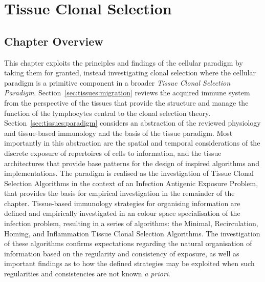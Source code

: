 %
%
\chapter{Tissue Clonal Selection}
\label{chap:tissues}

%
%
\section{Chapter Overview}
\label{sec:tissues:overview}
This chapter exploits the principles and findings of the cellular paradigm by taking them for granted, instead investigating clonal selection where the cellular paradigm is a primitive component in a broader \emph{Tissue Clonal Selection Paradigm}. 
Section~\ref{sec:tissues:migration} reviews the acquired immune system from the perspective of the tissues that provide the structure and manage the function of the lymphocytes central to the clonal selection theory. 
Section~\ref{sec:tissues:paradigm} considers an abstraction of the reviewed physiology and tissue-based immunology and the basis of the tissue paradigm. Most importantly in this abstraction are the spatial and temporal considerations of the discrete exposure of repertoires of cells to information, and the tissue architectures that provide base patterns for the design of inspired algorithms and implementations.
The paradigm is realised as the investigation of Tissue Clonal Selection Algorithms in the context of an Infection Antigenic Exposure Problem, that provides the basis for empirical investigation in the remainder of the chapter. Tissue-based immunology strategies for organising information are defined and empirically investigated in an colour space specialisation of the infection problem, resulting in a series of algorithms: the Minimal, Recirculation, Homing, and Inflammation Tissue Clonal Selection Algorithms. 
The investigation of these algorithms confirms expectations regarding the natural organisation of information based on the regularity and consistency of exposure, as well as important findings as to how the defined strategies may be exploited when such regularities and consistencies are not known \emph{a priori}.

%
%
